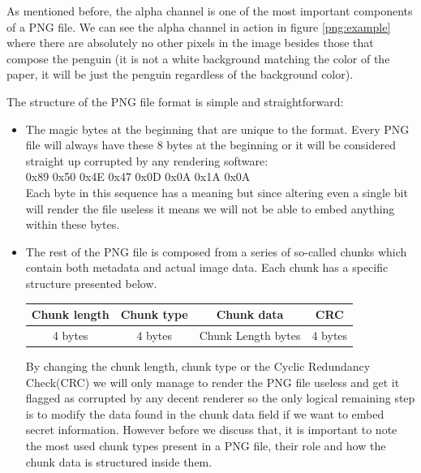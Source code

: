 \begin{multicols*}{2}
As mentioned before, the alpha channel is one of the most important components of a PNG file. We can see the alpha channel in action in figure \ref{png:example} where there are absolutely no other pixels in the image besides those that compose the penguin (it is not a white background matching the color of the paper, it will be just the penguin regardless of the background color). 

The structure of the PNG file format is simple and straightforward:
\begin{itemize}
  \item The magic bytes at the beginning that are unique to the format. Every PNG file will always have these 8 bytes at the beginning or it will be considered straight up corrupted by any rendering software:
\\0x89 0x50 0x4E 0x47 0x0D 0x0A 0x1A 0x0A\\
Each byte in this sequence has a meaning but since altering even a single bit will render the file useless it means we will not be able to embed anything within these bytes.
  \item The rest of the PNG file is composed from a series of so-called chunks which contain both metadata and actual image data. Each chunk has a specific structure presented below.
	\begin{table}[]
	\begin{tabular}{|c|c|c|c|}
	\hline
	\textbf{Chunk length} & \textbf{Chunk type} & \textbf{Chunk data} & \textbf{CRC} \\ \hline
	4 bytes & 4 bytes & Chunk Length bytes & 4 bytes \\ \hline
	\end{tabular}
	\end{table}
By changing the chunk length, chunk type or the Cyclic Redundancy Check(CRC) we will only manage to render the PNG file useless and get it flagged as corrupted by any decent renderer so the only logical remaining step is to modify the data found in the chunk data field if we want to embed secret information. However before we discuss that, it is important to note the most used chunk types present in a PNG file, their role and how the chunk data is structured inside them.
\end{itemize}

\end{multicols*}
